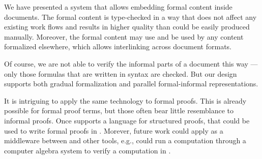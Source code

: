 We have presented a system that allows embedding formal \mmt content inside \latex documents.
The formal content is type-checked in a way that does not affect any existing \latex work flows and results in higher quality \latex than could be easily  produced manually.
Moreover, the formal content may use and be used by any \mmt content formalized elsewhere, which allows interlinking across document formats.

Of course, we are not able to verify the informal parts of a document this way --- only those formulas that are written in \mmt syntax are checked.
But our design supports both gradual formalization and parallel formal-informal representations.

It is intriguing to apply the same technology to formal proofs.
This is already possible for formal proof terms, but those often bear little resemblance to informal proofs.
Once \mmt supports a language for structured proofs, that could be used to write formal proofs in \mmttex.
Morever, future work could apply \mmt as a middleware between \latex and other tools, e.g., \mmt could run a computation through a computer algebra system to verify a computation in \latex.
